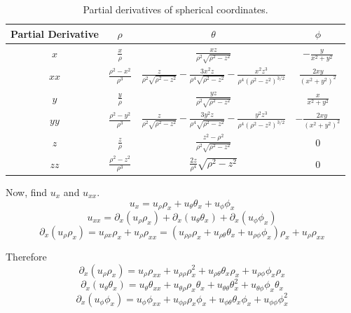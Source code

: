 \documentclass{article}
\begin{document}
\begin{table}[h!]
\centering
\renewcommand{\arraystretch}{1.5} %
\setlength{\tabcolsep}{10pt} %
\begin{tabular}{|c|c|c|c|}
\hline
\textbf{Partial Derivative} & \textbf{$\rho$} & \textbf{$\theta$} & \textbf{$\phi$} \\
\hline
$x$ & $\frac{x}{\rho}$ & $\frac{xz}{\rho^2 \sqrt{\rho^2 - z^2}}$ & $-\frac{y}{x^2 + y^2}$ \\
\hline
$xx$ & $\frac{\rho^2 - x^2}{\rho^3}$ & $\frac{z}{\rho^2 \sqrt{\rho^2 - z^2}} - \frac{3x^2z}{\rho^4 \sqrt{\rho^2 - z^2}} - \frac{x^2z^3}{\rho^4(\rho^2 - z^2)^{3/2}}$ & $\frac{2xy}{(x^2 + y^2)^2}$ \\
\hline
$y$ & $\frac{y}{\rho}$ & $\frac{yz}{\rho^2 \sqrt{\rho^2 - z^2}}$ & $\frac{x}{x^2 + y^2}$ \\
\hline
$yy$ & $\frac{\rho^2 - y^2}{\rho^3}$ & $\frac{z}{\rho^2 \sqrt{\rho^2 - z^2}} - \frac{3y^2z}{\rho^4 \sqrt{\rho^2 - z^2}} - \frac{y^2z^3}{\rho^4(\rho^2 - z^2)^{3/2}}$ & $-\frac{2xy}{(x^2 + y^2)^2}$ \\
\hline
$z$ & $\frac{z}{\rho}$ & $\frac{z^2 - \rho^2}{\rho^2 \sqrt{\rho^2 - z^2}}$ & $0$ \\
\hline
$zz$ & $\frac{\rho^2 - z^2}{\rho^3}$ & $\frac{2z}{\rho^4} \sqrt{\rho^2 - z^2}$ & $0$ \\
\hline
\end{tabular}
\caption{Partial derivatives of spherical coordinates.}
\label{tab:partials}
\end{table}
  
Now, find $u_x$ and $u_{xx}$.
\begin{equation*}
  u_x = u_\rho \rho_x + u_\theta \theta_x + u_\phi \phi_x
\end{equation*}
\begin{equation*}
  u_{xx} = \partial_x (u_\rho \rho_x) + \partial_x (u_\theta \theta_x) + \partial_x (u_\phi \phi_x)
\end{equation*}
\begin{equation*}
  \partial_x (u_\rho \rho_x) = u_{\rho x}\rho_x + u_\rho \rho_{xx} = ( u_{\rho \rho} \rho_x + u_{\rho \theta} \theta_x + u_{\rho \phi} \phi_x )\rho_x + u_\rho \rho_{xx}
\end{equation*}

Therefore
\begin{equation*}
  \partial_x (u_\rho \rho_x) = u_\rho \rho_{xx} + u_{\rho \rho} \rho_x^2 + u_{\rho \theta} \theta_x \rho_x + u_{\rho \phi} \phi_x \rho_x
\end{equation*}
\begin{equation*}
  \partial_x (u_\theta \theta_x) = u_\theta \theta_{xx} + u_{\theta \rho} \rho_x \theta_x + u_{\theta \theta} \theta_x^2 + u_{\theta \phi} \phi_x \theta_x
\end{equation*}
\begin{equation*}
  \partial_x (u_\phi \phi_x) = u_\phi \phi_{xx} + u_{\phi \rho} \rho_x \phi_x + u_{\phi \theta} \theta_x \phi_x + u_{\phi \phi} \phi_x^2
\end{equation*}
\end{document}
